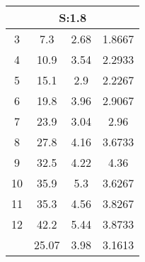 
	\begin{table}[H]
		\begin{tabular}{c|ccc}
			\multicolumn{4}{c}{S:1.8}\\\hline
			3 & 7.3 & 2.68 & 1.8667\\
			4 & 10.9 & 3.54 & 2.2933\\
			5 & 15.1 & 2.9 & 2.2267\\
			6 & 19.8 & 3.96 & 2.9067\\
			7 & 23.9 & 3.04 & 2.96\\
			8 & 27.8 & 4.16 & 3.6733\\
			9 & 32.5 & 4.22 & 4.36\\
			10 & 35.9 & 5.3 & 3.6267\\
			11 & 35.3 & 4.56 & 3.8267\\
			12 & 42.2 & 5.44 & 3.8733\\
			\hline
			& 25.07 & 3.98 & 3.1613\\
		\end{tabular}
	\end{table}